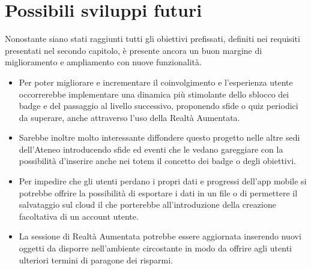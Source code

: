 \section*{Possibili sviluppi futuri}
Nonostante siano stati raggiunti tutti gli obiettivi prefissati, definiti nei requisiti presentati nel secondo capitolo, è presente ancora un buon margine di miglioramento e ampliamento con nuove funzionalità.
\begin{itemize}
    \itemsep1em
    \item Per poter migliorare e incrementare il coinvolgimento e l'esperienza utente occorrerebbe implementare una dinamica più stimolante dello sblocco dei badge e del passaggio al livello successivo, proponendo sfide o quiz periodici da superare, anche attraverso l'uso della Realtà Aumentata.
    \item Sarebbe inoltre molto interessante diffondere questo progetto nelle altre sedi dell'Ateneo introducendo sfide ed eventi che le vedano gareggiare con la possibilità d'inserire anche nei totem il concetto dei badge o degli obiettivi.
    \item Per impedire che gli utenti perdano i propri dati e progressi dell'app mobile si potrebbe offrire la possibilità di esportare i dati in un file o di permettere il salvataggio sul cloud il che porterebbe all'introduzione della creazione facoltativa di un account utente.
    \item La sessione di Realtà Aumentata potrebbe essere aggiornata inserendo nuovi oggetti da disporre nell'ambiente circostante in modo da offrire agli utenti ulteriori termini di paragone dei risparmi.
\end{itemize}
